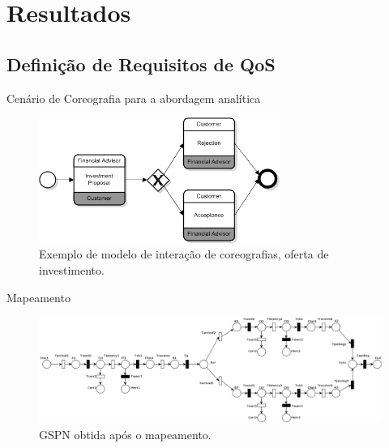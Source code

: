 \documentclass[xcolor=svgnames]{beamer}
\begin{document}
\section{Resultados}
\subsection{Definição de Requisitos de QoS}

  \begin{frame}{Cenário de Coreografia para a abordagem analítica}
    \begin{figure}[!h]
	\centering
	\includegraphics[width=0.7\textwidth]{figures/Example-InteractionChor.png}
	\caption{Exemplo de modelo de interação de coreografias, oferta de investimento. }%
	\label{fig:Example-InteractionChor}
    \end{figure}
  \end{frame}

  \begin{frame}{Mapeamento}
    \begin{figure}[!h]
    	\centering
    	\includegraphics[width=1.0\textwidth]{BPMNChoreographyExample-QoS.png}
    	\caption{GSPN obtida após o mapeamento.}
    \end{figure}
  \end{frame}
\end{document}
